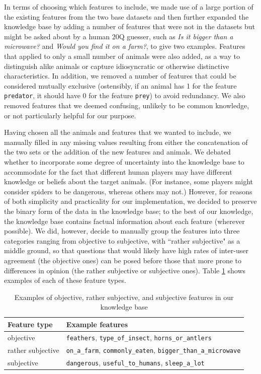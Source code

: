 \documentclass[11pt,a4paper]{article}
\begin{document}
{In terms of choosing which features to include, we made use of a large portion of the existing features from the two base datasets and then further expanded the knowledge base by adding a number of features that were not in the datasets but might be asked about by a human 20Q guesser, such as \textit{Is it bigger than a microwave?} and \textit{Would you find it on a farm?}, to give two examples.
Features that applied to only a small number of animals were also added, as a way to distinguish alike animals or capture idiosyncratic or otherwise distinctive characteristics. 
In addition, we removed a number of features that could be considered mutually exclusive (ostensibly, if an animal has 1 for the feature \texttt{predator}, it should have 0 for the feature \texttt{prey}) to avoid redundancy. 
We also removed features that we deemed confusing, unlikely to be common knowledge, or not particularly helpful for our purpose.

Having chosen all the animals and features that we wanted to include, we manually filled in any missing values resulting from either the concatenation of the two sets or the addition of the new features and animals. 
We debated whether to incorporate some degree of uncertainty into the knowledge base to accommodate for the fact that different human players may have different knowledge or beliefs about the target animals. 
(For instance, some players might consider spiders to be dangerous, whereas others may not.) 
However, for reasons of both simplicity and practicality for our implementation, we decided to preserve the binary form of the data in the knowledge base; to the best of our knowledge, the knowledge base contains factual information about each feature (wherever possible). 
We did, however, decide to manually group the features into three categories ranging from objective to subjective, with ``rather subjective" as a middle ground, so that questions that would likely have high rates of inter-user agreement (the objective ones) can be posed before those that more prone to differences in opinion (the rather subjective or subjective ones). 
Table \ref{tab:feature-types} shows examples of each of these feature types.

\begin{table}
    \centering
    \begin{tabular}{ll}
    \toprule
    Feature type & Example features \\ 
    \midrule
         objective &  \texttt{feathers}, \texttt{type\_of\_insect}, \texttt{horns\_or\_antlers} \\
         rather subjective & \texttt{on\_a\_farm}, \texttt{commonly\_eaten}, \texttt{bigger\_than\_a\_microwave} \\
         subjective & \texttt{dangerous}, \texttt{useful\_to\_humans}, \texttt{sleep\_a\_lot}\\
    \bottomrule
    \end{tabular}
    \caption{Examples of objective, rather subjective, and subjective features in our knowledge base}
    \label{tab:feature-types}
\end{table}

}
\end{document}
